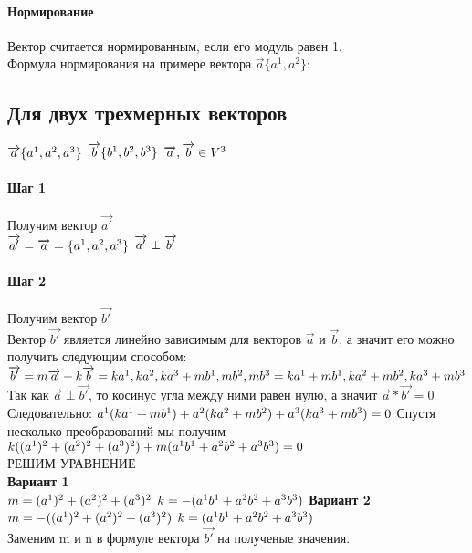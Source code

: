 \documentclass{article}
\begin{document}
\paragraph*{Нормирование}
Вектор считается нормированным, если его модуль равен 1.\\
Формула нормирования на примере вектора $\overrightarrow{a}\{a^1,a^2\}$:
\subsection{Для двух трехмерных векторов}
$\overrightarrow{a}\{a^1,a^2,a^3\}\\$
$\overrightarrow{b}\{b^1,b^2,b^3\}\\$
$\overrightarrow{a},\overrightarrow{b} \in V^3\\$
\paragraph*{Шаг 1}
Получим вектор $\overrightarrow{a'}$\\
$\overrightarrow{a'}=\overrightarrow{a}=\{a^1,a^2,a^3\}\\$
$\overrightarrow{a'}\perp\overrightarrow{b'}\\$
\paragraph*{Шаг 2}
Получим вектор $\overrightarrow{b'}$\\
Вектор $\overrightarrow{b'}$ является линейно зависимым для векторов $\overrightarrow{a}$ и $\overrightarrow{b}$, а значит его можно получить следующим способом:\\
$\overrightarrow{b'}=m\overrightarrow{a}+k\overrightarrow{b}={ka^1,ka^2,ka^3}+{mb^1,mb^2,mb^3}={ka^1+mb^1,ka^2+mb^2,ka^3+mb^3}\\$
Так как $\overrightarrow{a}\perp\overrightarrow{b'}$, то косинус угла между ними равен нулю, а значит $\overrightarrow{a}*\overrightarrow{b'}=0$\\
Следовательно: $a^1(ka^1+mb^1)+a^2(ka^2+mb^2)+a^3(ka^3+mb^3)=0\\$
Спустя несколько преобразований мы получим $k((a^1)^2+(a^2)^2+(a^3)^2)+m(a^1b^1+a^2b^2+a^3b^3)=0\\$\\
РЕШИМ УРАВНЕНИЕ\\
\textbf{Вариант 1}\\
$m=(a^1)^2+(a^2)^2+(a^3)^2\\$
$k=-(a^1b^1+a^2b^2+a^3b^3)\\$
\textbf{Вариант 2}\\
$m=-((a^1)^2+(a^2)^2+(a^3)^2)\\$
$k=(a^1b^1+a^2b^2+a^3b^3)\\$
\\
Заменим m и n в формуле вектора $\overrightarrow{b'}$ на полученые значения.
\end{document}
